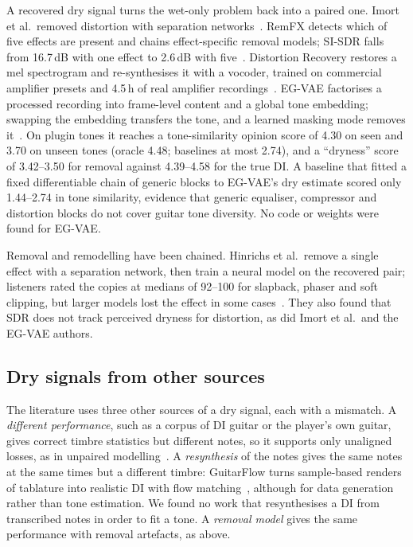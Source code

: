 A recovered dry signal turns the wet-only problem back into a paired one.
Imort et al.\ removed distortion with separation networks~\cite{imort2022distortion}.
RemFX detects which of five effects are present and chains effect-specific
removal models; SI-SDR falls from 16.7\,dB with one effect to 2.6\,dB with
five~\cite{rice2023general}. Distortion Recovery restores a mel spectrogram and
re-synthesises it with a vocoder, trained on commercial amplifier presets and
4.5\,h of real amplifier recordings~\cite{lee2024distortion}. EG-VAE factorises
a processed recording into frame-level content and a global tone embedding;
swapping the embedding transfers the tone, and a learned masking mode removes
it~\cite{yeh2026egvae}. On plugin tones it reaches a tone-similarity opinion
score of 4.30 on seen and 3.70 on unseen tones (oracle 4.48; baselines at most
2.74), and a ``dryness'' score of 3.42--3.50 for removal against 4.39--4.58
for the true DI. A baseline that fitted a fixed differentiable chain of generic
blocks to EG-VAE's dry estimate scored only 1.44--2.74 in tone similarity,
evidence that generic equaliser, compressor and distortion blocks do not cover
guitar tone diversity. No code or weights were found for EG-VAE.

Removal and remodelling have been chained. Hinrichs et al.\ remove a single
effect with a separation network, then train a neural model on the recovered
pair; listeners rated the copies at medians of 92--100 for slapback, phaser
and soft clipping, but larger models lost the effect in some
cases~\cite{hinrichs2024blind}. They also found that SDR does not track
perceived dryness for distortion, as did Imort et al.\ and the EG-VAE authors.

\subsection{Dry signals from other sources}

The literature uses three other sources of a dry signal, each with a
mismatch. A \emph{different performance}, such as a corpus of DI guitar or the
player's own guitar, gives correct timbre statistics but different notes, so
it supports only unaligned losses, as in unpaired
modelling~\cite{wright2023adversarial}. A \emph{resynthesis} of the notes gives
the same notes at the same times but a different timbre: GuitarFlow turns
sample-based renders of tablature into realistic DI with flow
matching~\cite{loth2025guitarflow}, although for data generation rather than
tone estimation. We found no work that resynthesises a DI from transcribed
notes in order to fit a tone. A \emph{removal model} gives the same
performance with removal artefacts, as above.
